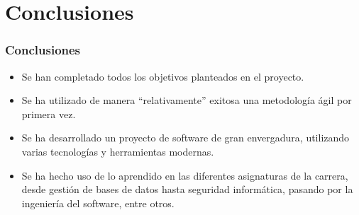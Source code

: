 \section{Conclusiones}
\begin{frame}
  \frametitle{Conclusiones}
  \begin{itemize}
    \item Se han completado todos los objetivos planteados en el proyecto.
    \pause

    \item Se ha utilizado de manera \enquote{relativamente} exitosa una
    metodología ágil por primera vez.
    \pause

    \item Se ha desarrollado un proyecto de software de gran envergadura,
    utilizando varias tecnologías y herramientas modernas.
    \pause

    \item Se ha hecho uso de lo aprendido en las diferentes asignaturas de la
    carrera, desde gestión de bases de datos hasta seguridad informática,
    pasando por la ingeniería del software, entre otros.
  \end{itemize}
\end{frame}
